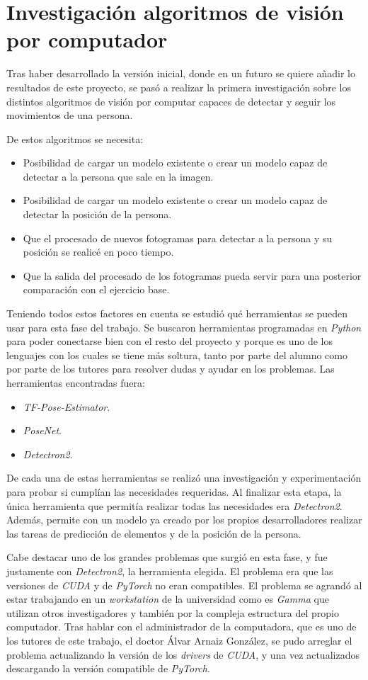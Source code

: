 \section{Investigación algoritmos de visión por computador}
Tras haber desarrollado la versión inicial, donde en un futuro se quiere añadir lo resultados de este proyecto, se pasó a realizar la primera investigación sobre los distintos algoritmos de visión por computar capaces de detectar y seguir los movimientos de una persona. 

De estos algoritmos se necesita:
\begin{itemize}
	\item Posibilidad de cargar un modelo existente o crear un modelo capaz de detectar a la persona que sale en la imagen.
	\item Posibilidad de cargar un modelo existente o crear un modelo capaz de detectar la posición de la persona.
	\item Que el procesado de nuevos fotogramas para detectar a la persona y su posición se realicé en poco tiempo.
	\item Que la salida del procesado de los fotogramas pueda servir para una posterior comparación con el ejercicio base.
\end{itemize}

Teniendo todos estos factores en cuenta se estudió qué herramientas se pueden usar para esta fase del trabajo. Se buscaron herramientas programadas en \textit{Python} para poder conectarse bien con el resto del proyecto y porque es uno de los lenguajes con los cuales se tiene más soltura, tanto por parte del alumno como por parte de los tutores para resolver dudas y ayudar en los problemas. Las herramientas encontradas fuera:
\begin{itemize}
	\item \textit{TF-Pose-Estimator}.
	\item \textit{PoseNet}.
	\item \textit{Detectron2}.
\end{itemize}

De cada una de estas herramientas se realizó una investigación y experimentación para probar si cumplían las necesidades requeridas. Al finalizar esta etapa, la única herramienta que permitía realizar todas las necesidades era \textit{Detectron2}. Además, permite con un modelo ya creado por los propios desarrolladores realizar las tareas de predicción de elementos y de la posición de la persona.

Cabe destacar uno de los grandes problemas que surgió en esta fase, y fue justamente con \textit{Detectron2}, la herramienta elegida. El problema era que las versiones de \textit{CUDA} y de \textit{PyTorch} no eran compatibles. El problema se agrandó al estar trabajando en un \textit{workstation} de la universidad como es \textit{Gamma} que utilizan otros investigadores y también por la compleja estructura del propio computador. Tras hablar con el administrador de la computadora, que es uno de los tutores de este trabajo, el doctor Álvar Arnaiz González, se pudo arreglar el problema actualizando la versión de los \textit{drivers} de \textit{CUDA}, y una vez actualizados descargando la versión compatible de \textit{PyTorch}. 
